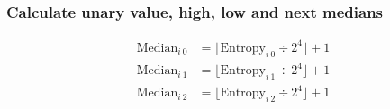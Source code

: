 \subsubsection{Calculate unary value, high, low and next medians}
\begin{align*}
\text{Median}_{i~0} &= \lfloor\text{Entropy}_{i~0}\div2 ^ 4\rfloor + 1 \\
\text{Median}_{i~1} &= \lfloor\text{Entropy}_{i~1}\div2 ^ 4\rfloor + 1 \\
\text{Median}_{i~2} &= \lfloor\text{Entropy}_{i~2}\div2 ^ 4\rfloor + 1 \\
\end{align*}
